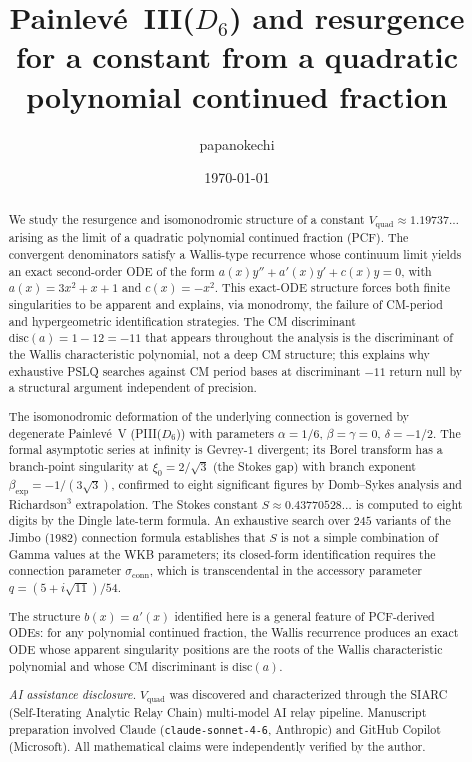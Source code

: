 \documentclass[11pt,a4paper]{article}
\title{Painlev\'e~III($D_6$) and resurgence
for a constant from a quadratic polynomial
continued fraction}
\author{papanokechi}
\date{\today}
\theoremstyle{definition}
\theoremstyle{remark}
\newcommand{\Vq}{V_{\mathrm{quad}}}
\begin{document}
\maketitle

\begin{abstract}
We study the resurgence and isomonodromic
structure of a constant $V_{\mathrm{quad}}
\approx 1.19737\ldots$ arising as the limit
of a quadratic polynomial continued fraction
(PCF). The convergent denominators satisfy a
Wallis-type recurrence whose continuum limit
yields an exact second-order ODE of the form
$a(x)y'' + a'(x)y' + c(x)y = 0$, with
$a(x) = 3x^2+x+1$ and $c(x) = -x^2$. This
exact-ODE structure forces both finite
singularities to be apparent and explains,
via monodromy, the failure of CM-period
and hypergeometric identification strategies.
The CM discriminant $\mathrm{disc}(a)
= 1 - 12 = -11$ that appears throughout
the analysis is the discriminant of the
Wallis characteristic polynomial, not a
deep CM structure; this explains why
exhaustive PSLQ searches against CM
period bases at discriminant $-11$ return
null by a structural argument independent
of precision.

The isomonodromic deformation of the
underlying connection is governed by
degenerate Painlev\'e~V (PIII($D_6$))
with parameters $\alpha=1/6$,
$\beta=\gamma=0$, $\delta=-1/2$.
The formal asymptotic series at infinity
is Gevrey-$1$ divergent; its Borel
transform has a branch-point singularity
at $\xi_0=2/\sqrt{3}$ (the Stokes gap)
with branch exponent
$\beta_{\mathrm{exp}}=-1/(3\sqrt{3})$,
confirmed to eight significant figures
by Domb--Sykes analysis and
Richardson$^3$ extrapolation.
The Stokes constant $S \approx
0.43770528\ldots$ is computed to eight
digits by the Dingle late-term formula.
An exhaustive search over $245$ variants
of the Jimbo (1982) connection formula
establishes that $S$ is not a simple
combination of Gamma values at the WKB
parameters; its closed-form identification
requires the connection parameter
$\sigma_{\mathrm{conn}}$, which is
transcendental in the accessory parameter
$q=(5+i\sqrt{11})/54$.

The structure $b(x)=a'(x)$ identified
here is a general feature of PCF-derived
ODEs: for any polynomial continued
fraction, the Wallis recurrence produces
an exact ODE whose apparent singularity
positions are the roots of the Wallis
characteristic polynomial and whose CM
discriminant is $\mathrm{disc}(a)$.

\smallskip
\noindent\textit{AI assistance disclosure.}
$\Vq$ was discovered and
characterized through the SIARC
(Self-Iterating Analytic Relay Chain)
multi-model AI relay pipeline.
Manuscript preparation involved Claude
(\texttt{claude-sonnet-4-6}, Anthropic)
and GitHub Copilot (Microsoft). All
mathematical claims were independently
verified by the author.
\end{abstract}
\end{document}
